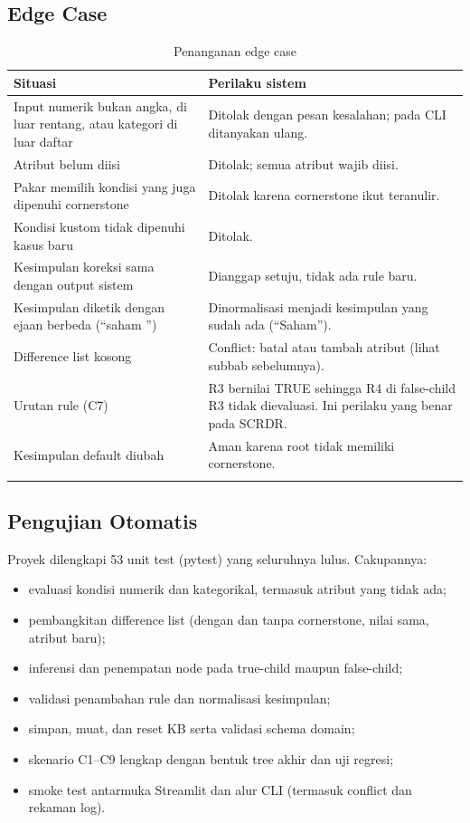 \documentclass[11pt,a4paper]{article}
\begin{document}
\subsection{Edge Case}
\begin{longtable}{P{0.38\textwidth}P{0.56\textwidth}}
\toprule
\textbf{Situasi} & \textbf{Perilaku sistem} \\
\midrule
\endhead
Input numerik bukan angka, di luar rentang, atau kategori di luar daftar & Ditolak dengan pesan
  kesalahan; pada CLI ditanyakan ulang. \\
Atribut belum diisi & Ditolak; semua atribut wajib diisi. \\
Pakar memilih kondisi yang juga dipenuhi cornerstone & Ditolak karena cornerstone ikut
  teranulir. \\
Kondisi kustom tidak dipenuhi kasus baru & Ditolak. \\
Kesimpulan koreksi sama dengan output sistem & Dianggap setuju, tidak ada rule baru. \\
Kesimpulan diketik dengan ejaan berbeda (``saham '') & Dinormalisasi menjadi kesimpulan yang
  sudah ada (``Saham''). \\
Difference list kosong & Conflict: batal atau tambah atribut (lihat subbab sebelumnya). \\
Urutan rule (C7) & R3 bernilai TRUE sehingga R4 di false-child R3 tidak dievaluasi. Ini
  perilaku yang benar pada SCRDR. \\
Kesimpulan default diubah & Aman karena root tidak memiliki cornerstone. \\
\bottomrule
\caption{Penanganan edge case}
\end{longtable}

\subsection{Pengujian Otomatis}
Proyek dilengkapi 53 unit test (pytest) yang seluruhnya lulus. Cakupannya:
\begin{itemize}[nosep]
  \item evaluasi kondisi numerik dan kategorikal, termasuk atribut yang tidak ada;
  \item pembangkitan difference list (dengan dan tanpa cornerstone, nilai sama, atribut baru);
  \item inferensi dan penempatan node pada true-child maupun false-child;
  \item validasi penambahan rule dan normalisasi kesimpulan;
  \item simpan, muat, dan reset KB serta validasi schema domain;
  \item skenario C1--C9 lengkap dengan bentuk tree akhir dan uji regresi;
  \item smoke test antarmuka Streamlit dan alur CLI (termasuk conflict dan rekaman log).
\end{itemize}
\end{document}
